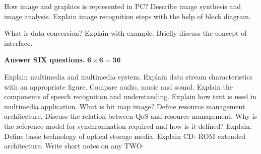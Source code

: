 \documentclass[a4paper, twoside, 12pt, noanswers]{exam}
\begin{document}
\begin{questions}

\question How image and graphics is represented in PC? Describe image
synthesis and image analysis. Explain image recognition steps
with the help of block diagram.

\question
{}

\question What is data conversion? Explain with example. Briefly discuss
the concept of interface.

{\par}
{\hspace*{-0.5cm}\noindent\bfseries Answer SIX questions.} \hfill {\( \mathbf{6 \times 6 = 36}\)}

\question Explain multimedia and multimedia system. Explain data
stream characteristics with an appropriate figure.
\question Compare audio, music and sound. Explain the components of
speech recognition and understanding.
\question Explain how text is used in multimedia application. What is bit
map image? 
\question Define resource management architecture. Discuss the relation
between QoS and resource management. 
\question Why is the reference model for synchronization required and how
is it defined? Explain.
\question Define basic technology of optical storage media. Explain CD-
ROM extended architecture.
\question Write short notes on any TWO:
 
\end{questions}
\newpage
\end{document}
